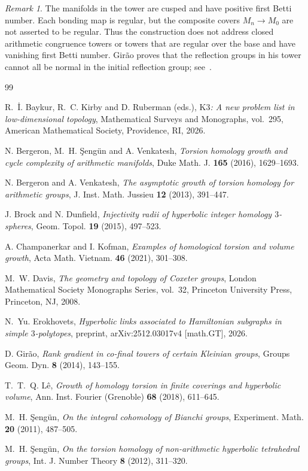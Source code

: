 \documentclass[11pt,a4paper]{amsart}
\theoremstyle{plain}
\theoremstyle{remark}
\newtheorem{remark}[theorem]{Remark}
\begin{document}
\begin{remark}\label{rem:scope}
The manifolds in the tower are cusped and have positive first Betti number.  Each bonding map is regular, but the composite covers $M_n\to M_0$ are not asserted to be regular.  Thus the construction does not address closed arithmetic congruence towers or towers that are regular over the base and have vanishing first Betti number.  Gir\~ao proves that the reflection groups in his tower cannot all be normal in the initial reflection group; see~\cite[Section~6]{Girao}.
\end{remark}

\begin{thebibliography}{99}

R.~\.{I}. Baykur, R.~C. Kirby and D. Ruberman (eds.),
\emph{$\mathrm{K3}$: A new problem list in low-dimensional topology},
Mathematical Surveys and Monographs, vol.~295, American Mathematical Society, Providence, RI, 2026.

N. Bergeron, M.~H. \c{S}eng\"un and A. Venkatesh,
\emph{Torsion homology growth and cycle complexity of arithmetic manifolds},
Duke Math. J. \textbf{165} (2016), 1629--1693.

N. Bergeron and A. Venkatesh,
\emph{The asymptotic growth of torsion homology for arithmetic groups},
J. Inst. Math. Jussieu \textbf{12} (2013), 391--447.

J. Brock and N. Dunfield,
\emph{Injectivity radii of hyperbolic integer homology $3$-spheres},
Geom. Topol. \textbf{19} (2015), 497--523.

A. Champanerkar and I. Kofman,
\emph{Examples of homological torsion and volume growth},
Acta Math. Vietnam. \textbf{46} (2021), 301--308.

M.~W. Davis,
\emph{The geometry and topology of Coxeter groups},
London Mathematical Society Monographs Series, vol.~32, Princeton University Press, Princeton, NJ, 2008.

N.~Yu. Erokhovets,
\emph{Hyperbolic links associated to Hamiltonian subgraphs in simple $3$-polytopes},
preprint, arXiv:2512.03017v4 [math.GT], 2026.

D. Gir\~ao,
\emph{Rank gradient in co-final towers of certain Kleinian groups},
Groups Geom. Dyn. \textbf{8} (2014), 143--155.

T.~T.~Q. L\^e,
\emph{Growth of homology torsion in finite coverings and hyperbolic volume},
Ann. Inst. Fourier (Grenoble) \textbf{68} (2018), 611--645.

M.~H. \c{S}eng\"un,
\emph{On the integral cohomology of Bianchi groups},
Experiment. Math. \textbf{20} (2011), 487--505.

M.~H. \c{S}eng\"un,
\emph{On the torsion homology of non-arithmetic hyperbolic tetrahedral groups},
Int. J. Number Theory \textbf{8} (2012), 311--320.

\end{thebibliography}
\end{document}
